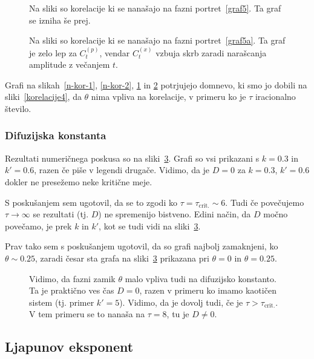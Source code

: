 \documentclass[a4paper, 12pt]{article}
\begin{document}
\begin{figure}[H]\centering
	
	\caption{Na sliki so korelacije ki se nana\v sajo na fazni portret~\ref{graf5}. Ta graf se izniha \v se prej.}
	\label{n-kor-3}
\end{figure}

\begin{figure}[H]\centering
	
	\caption{Na sliki so korelacije ki se nana\v sajo na fazni portret~\ref{graf5a}.
		Ta graf je zelo lep za $C^{(p)}_t$, vendar $C^{(x)}_t$ vzbuja skrb zaradi nara\v scanja amplitude z
		ve\v canjem $t$.}
	\label{n-kor-4}
\end{figure}

Grafi na slikah~\ref{n-kor-1}, \ref{n-kor-2}, \ref{n-kor-3} in \ref{n-kor-4} potrjujejo domnevo, ki smo jo dobili
na sliki~\ref{korelacije4}, da $\theta$ nima vpliva na korelacije, v primeru ko je $\tau$ iracionalno \v stevilo.

\subsubsection{Difuzijska konstanta}

Rezultati numeri\v cnega poskusa so na sliki~\ref{difuzija}. Grafi so vsi prikazani s $k = 0.3$ in $k' = 0.6$, razen \v ce
pi\v se v legendi druga\v ce. Vidimo, da je $D = 0$ za $k = 0.3$, $k' = 0.6$ dokler ne
prese\v zemo neke kriti\v cne meje.

S posku\v sanjem sem ugotovil, da se to zgodi ko $\tau = \tau_\text{crit.} \sim 6$. Tudi \v ce pove\v cujemo $\tau \to \infty$
se rezultati (tj. $D$) ne spremenijo bistveno. Edini na\v cin, da $D$ mo\v cno pove\v camo, je prek $k$ in $k'$, kot se tudi
vidi na sliki~\ref{difuzija}.

Prav tako sem s posku\v sanjem ugotovil, da so grafi najbolj zamaknjeni, ko $\theta \sim 0.25$, zaradi \v cesar
sta grafa na sliki~\ref{difuzija} prikazana pri $\theta = 0$ in $\theta = 0.25$.

\begin{figure}[H]\centering
	
	\caption{Vidimo, da fazni zamik $\theta$ malo vpliva tudi na difuzijsko konstanto. Ta je prakti\v cno ves \v cas
	$D = 0$, razen v primeru ko imamo kaoti\v cen sistem (tj. primer $k' = 5$). Vidimo, da je dovolj tudi, \v ce je
	$\tau > \tau_\text{crit.}$. V tem primeru se to nana\v sa na $\tau = 8$, tu je $D \neq 0$.}
	\label{difuzija}
\end{figure}

\subsection{Ljapunov eksponent}
\end{document}
